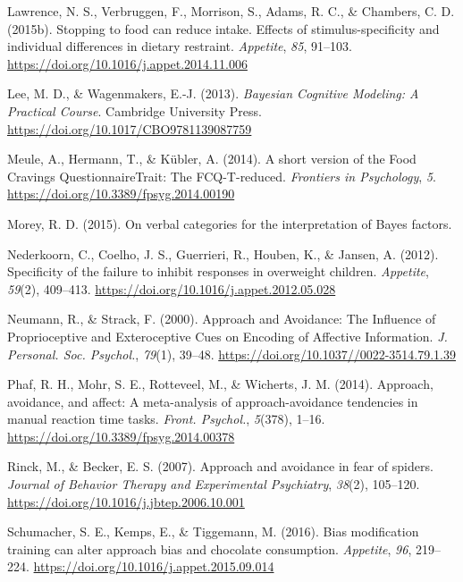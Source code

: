 \documentclass[man,floatsintext]{apa6}
\begin{document}
\leavevmode\hypertarget{ref-lawrence_stopping_2015}{}%
Lawrence, N. S., Verbruggen, F., Morrison, S., Adams, R. C., \& Chambers, C. D. (2015b). Stopping to food can reduce intake. Effects of stimulus-specificity and individual differences in dietary restraint. \emph{Appetite}, \emph{85}, 91--103. \url{https://doi.org/10.1016/j.appet.2014.11.006}

\leavevmode\hypertarget{ref-lee_bayesian_2013}{}%
Lee, M. D., \& Wagenmakers, E.-J. (2013). \emph{Bayesian Cognitive Modeling: A Practical Course}. Cambridge University Press. \url{https://doi.org/10.1017/CBO9781139087759}

\leavevmode\hypertarget{ref-meule_short_2014}{}%
Meule, A., Hermann, T., \& Kübler, A. (2014). A short version of the Food Cravings QuestionnaireTrait: The FCQ-T-reduced. \emph{Frontiers in Psychology}, \emph{5}. \url{https://doi.org/10.3389/fpsyg.2014.00190}

\leavevmode\hypertarget{ref-richard_d._morey_verbal_2015}{}%
Morey, R. D. (2015). On verbal categories for the interpretation of Bayes factors.

\leavevmode\hypertarget{ref-nederkoorn_specificity_2012}{}%
Nederkoorn, C., Coelho, J. S., Guerrieri, R., Houben, K., \& Jansen, A. (2012). Specificity of the failure to inhibit responses in overweight children. \emph{Appetite}, \emph{59}(2), 409--413. \url{https://doi.org/10.1016/j.appet.2012.05.028}

\leavevmode\hypertarget{ref-neumann_approach_2000}{}%
Neumann, R., \& Strack, F. (2000). Approach and Avoidance: The Influence of Proprioceptive and Exteroceptive Cues on Encoding of Affective Information. \emph{J. Personal. Soc. Psychol.}, \emph{79}(1), 39--48. \url{https://doi.org/10.1037//0022-3514.79.1.39}

\leavevmode\hypertarget{ref-phaf_approach_2014}{}%
Phaf, R. H., Mohr, S. E., Rotteveel, M., \& Wicherts, J. M. (2014). Approach, avoidance, and affect: A meta-analysis of approach-avoidance tendencies in manual reaction time tasks. \emph{Front. Psychol.}, \emph{5}(378), 1--16. \url{https://doi.org/10.3389/fpsyg.2014.00378}

\leavevmode\hypertarget{ref-rinck_approach_2007}{}%
Rinck, M., \& Becker, E. S. (2007). Approach and avoidance in fear of spiders. \emph{Journal of Behavior Therapy and Experimental Psychiatry}, \emph{38}(2), 105--120. \url{https://doi.org/10.1016/j.jbtep.2006.10.001}

\leavevmode\hypertarget{ref-schumacher_bias_2016}{}%
Schumacher, S. E., Kemps, E., \& Tiggemann, M. (2016). Bias modification training can alter approach bias and chocolate consumption. \emph{Appetite}, \emph{96}, 219--224. \url{https://doi.org/10.1016/j.appet.2015.09.014}
\end{document}
